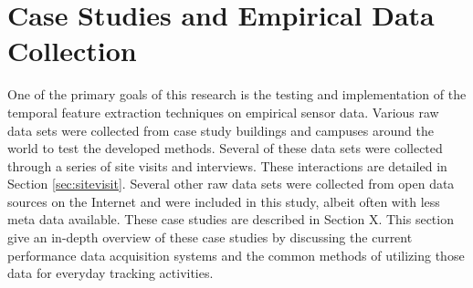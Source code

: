 \section{Case Studies and Empirical Data Collection}
\label{sec:casestudies}

One of the primary goals of this research is the testing and implementation of the temporal feature extraction techniques on empirical sensor data. Various raw data sets were collected from case study buildings and campuses around the world to test the developed methods. Several of these data sets were collected through a series of site visits and interviews. These interactions are detailed in Section \ref{sec:sitevisit}. Several other raw data sets were collected from open data sources on the Internet and were included in this study, albeit often with less meta data available. These case studies are described in Section X. This section give an in-depth overview of these case studies by discussing the current performance data acquisition systems and the common methods of utilizing those data for everyday tracking activities.